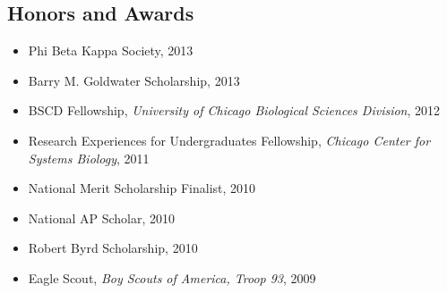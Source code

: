 \documentclass[]{article}
\begin{document}
\subsection{Honors and Awards}\label{honors-and-awards}

\begin{itemize}
\itemsep1pt\parskip0pt
\item
  Phi Beta Kappa Society, 2013
\item
  Barry M. Goldwater Scholarship, 2013
\item
  BSCD Fellowship, \emph{University of Chicago Biological Sciences
  Division}, 2012
\item
  Research Experiences for Undergraduates Fellowship, \emph{Chicago
  Center for Systems Biology}, 2011
\item
  National Merit Scholarship Finalist, 2010
\item
  National AP Scholar, 2010
\item
  Robert Byrd Scholarship, 2010
\item
  Eagle Scout, \emph{Boy Scouts of America, Troop 93}, 2009
\end{itemize}
\end{document}
